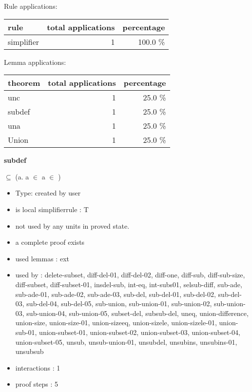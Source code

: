 \documentclass[a4paper]{article}
\begin{document}
Rule applications:

\begin{supertabular}{l|r|r}
rule	        & total applications & percentage \\ \hline
simplifier & 1 & 100.0 \% \\

\end{supertabular}

Lemma applications:

\begin{supertabular}{l|r|r}
theorem	        & total applications & percentage \\ \hline
unc & 1 & 25.0 \% \\
subdef & 1 & 25.0 \% \\
una & 1 & 25.0 \% \\
Union & 1 & 25.0 \% \\

\end{supertabular}
\pagebreak

{\LARGE\bf subdef}\label{lemma-subdef}

\medskip

 \Fol {} $\subseteq$  \Equiv (\All a. a $\in$  \Imp a $\in$ )

\begin{itemize}

\item Type: created by user

\item is local simplifierrule : T
\item not used by any units in proved state.
\item       a complete proof exists
\item       used lemmas  : ext
\item       used by      : delete-subset, diff-del-01, diff-del-02, diff-one, diff-sub, diff-sub-size, diff-subset, diff-subset-01, insdel-sub, int-eq, int-subs01, selsub-diff, sub-ade, sub-ade-01, sub-ade-02, sub-ade-03, sub-del, sub-del-01, sub-del-02, sub-del-03, sub-del-04, sub-del-05, sub-union, sub-union-01, sub-union-02, sub-union-03, sub-union-04, sub-union-05, subset-del, subsub-del, uneq, union-difference, union-size, union-size-01, union-sizeeq, union-sizele, union-sizele-01, union-sub-01, union-subset-01, union-subset-02, union-subset-03, union-subset-04, union-subset-05, unsub, unsub-union-01, unsubdel, unsubins, unsubins-01, unsubsub
\item       interactions : 1
\item       proof steps  : 5
\end{itemize}
\end{document}
